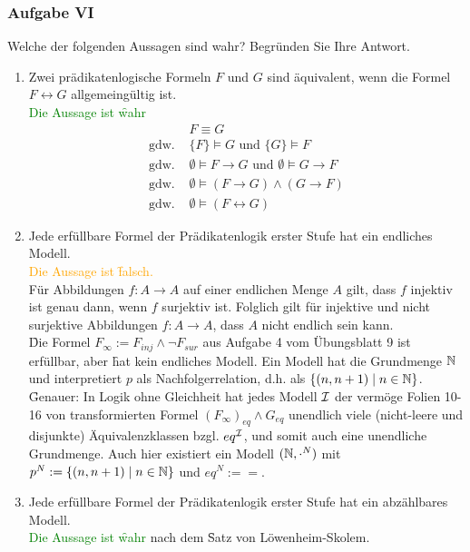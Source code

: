 \subsubsection*{Aufgabe VI}
Welche der folgenden Aussagen sind wahr? Begründen Sie Ihre Antwort.
\begin{enumerate}
\item Zwei prädikatenlogische Formeln $F$ und $G$ sind äquivalent, wenn die Formel $F \leftrightarrow G$ allgemeingültig ist. \\
\LOES \textcolor{green}{Die Aussage ist \f{wahr}} \\
\begin{align*}
& F \equiv G \\
\text{gdw. }& \{F\} \models G \text{ und } \{G\} \models F \\
\text{gdw. }& \emptyset \models F \to G \text{ und } \emptyset \models G \to F \\
\text{gdw. }& \emptyset \models (F \to G) \land (G \to F) \\
\text{gdw. }& \emptyset \models (F \leftrightarrow G)
\end{align*}
\item Jede erfüllbare Formel der Prädikatenlogik erster Stufe hat ein endliches Modell. \\
\LOES \textcolor{orange}{Die Aussage ist \f{falsch.}} \\
Für Abbildungen $f: A \to A$ auf einer endlichen Menge $A$ gilt, dass $f$ injektiv ist genau dann, wenn $f$ surjektiv ist. Folglich gilt für injektive und nicht surjektive Abbildungen $f: A \to A$, dass $A$ nicht endlich sein kann. \\
\f{Die Formel} $F_{\infty} := F_{inj} \land \lnot F_{sur}$ aus Aufgabe 4 vom Übungsblatt 9 ist erfüllbar, aber \f{hat kein endliches Modell}. Ein Modell hat die Grundmenge $\mathbb{N}$ und interpretiert $p$ als Nachfolgerrelation, d.h. als $\{(n, n+1) \mid n \in \mathbb{N} \}$. \\
\f{Genauer:} In Logik ohne Gleichheit hat jedes Modell $\mathcal{I}$ der vermöge Folien 10-16 von  transformierten Formel $(F_{\infty})_{eq} \land G_{eq}$ unendlich viele (nicht-leere und disjunkte) Äquivalenzklassen bzgl. $eq^{\mathcal{I}}$, und somit auch eine unendliche Grundmenge. Auch hier existiert ein Modell $(\mathbb{N}, \cdot^N)$ mit $p^N := \{(n,n+1) \mid n \in \mathbb{N}\}$ und $eq^N := =$.
\item Jede erfüllbare Formel der Prädikatenlogik erster Stufe hat ein abzählbares Modell. \\
\LOES \textcolor{green}{Die Aussage ist \f{wahr}} nach dem \f{Satz von Löwenheim-Skolem.}

\end{enumerate}
